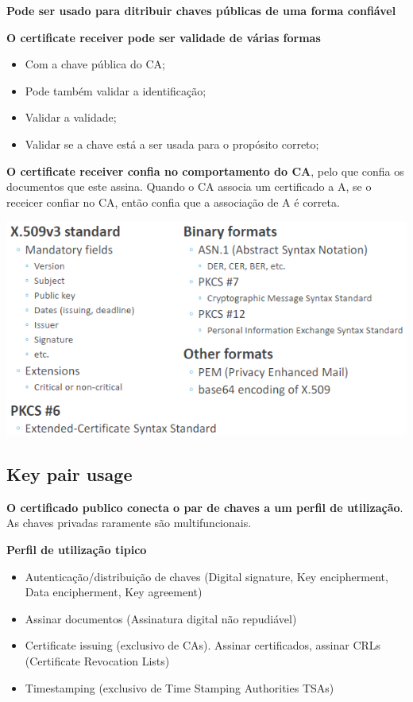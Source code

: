 \documentclass{article}
\begin{document}
\textbf{Pode ser usado para ditribuir chaves públicas de uma forma confiável}

\begin{flushleft}
  \textbf{O certificate receiver pode ser validade de várias formas}
  \begin{itemize}
    \item Com a chave pública do CA;
    \item Pode também validar a identificação;
    \item Validar a validade;
    \item Validar se a chave está a ser usada para o propósito correto;
  \end{itemize}

  \vspace{2mm}

  \textbf{O certificate receiver confia no comportamento do CA}, pelo que
  confia os documentos que este assina. Quando o CA associa um certificado a A,
  se o receicer confiar no CA, então confia que a associação de A é correta.
\end{flushleft}

\pagebreak

\begin{center}
  \includegraphics[scale=0.6]{16}
\end{center}

\subsection{Key pair usage}

\textbf{O certificado publico conecta o par de chaves a um perfil de utilização}.
As chaves privadas raramente são multifuncionais.

\vspace{2mm}

\textbf{Perfil de utilização tipico}
\begin{itemize}
  \item Autenticação/distribuição de chaves
  (Digital signature, Key encipherment, Data encipherment, Key agreement)
  \item Assinar documentos (Assinatura digital não repudiável)
  \item Certificate issuing (exclusivo de CAs). Assinar certificados,
  assinar CRLs (Certificate Revocation Lists)
  \item Timestamping (exclusivo de Time Stamping Authorities TSAs)
\end{itemize}
\end{document}
